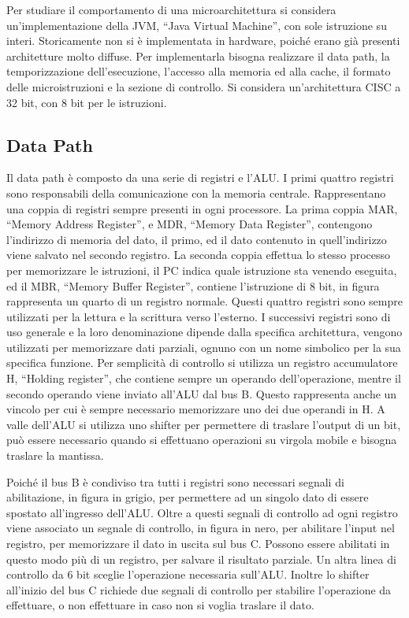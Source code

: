 \documentclass{article}
\numberwithin{equation}{subsection}
\begin{document}
Per studiare il comportamento di una microarchitettura si considera un'implementazione della JVM, ``Java Virtual Machine'', con sole istruzione su interi. Storicamente non si è implementata 
in hardware, poiché erano già presenti architetture molto diffuse. Per implementarla bisogna realizzare il data path, la temporizzazione dell'esecuzione, l'accesso alla memoria ed alla cache, 
il formato delle microistruzioni e la sezione di controllo. Si considera un'architettura CISC a 32 bit, con 8 bit per le istruzioni. 

\subsection{Data Path}

Il data path è composto da una serie di registri e l'ALU. I primi quattro registri sono responsabili della comunicazione con la memoria centrale. Rappresentano una coppia di registri 
sempre presenti in ogni processore. La prima coppia MAR, ``Memory Address Register'', e MDR, ``Memory Data Register'', contengono l'indirizzo di memoria del dato, il primo, ed il dato 
contenuto in quell'indirizzo viene salvato nel secondo registro. La seconda coppia effettua lo stesso processo per memorizzare le istruzioni, il PC indica quale istruzione sta venendo 
eseguita, ed il MBR, ``Memory Buffer Register'', contiene l'istruzione di 8 bit, in figura rappresenta un quarto di un registro normale. Questi 
quattro registri sono sempre utilizzati per la lettura e la scrittura verso l'esterno. 
I successivi registri sono di uso generale e la loro denominazione dipende dalla specifica architettura, vengono utilizzati per memorizzare dati parziali, ognuno con un nome 
simbolico per la sua specifica funzione. Per semplicità di controllo si utilizza un registro accumulatore H, ``Holding register'', che contiene sempre un operando dell'operazione, mentre il secondo 
operando viene inviato all'ALU dal bus B. Questo rappresenta anche un vincolo per cui è sempre necessario memorizzare uno dei due operandi in H. 
A valle dell'ALU si utilizza uno shifter per permettere di traslare l'output di un bit, può essere necessario quando si effettuano operazioni su virgola mobile e bisogna traslare la mantissa. 

Poiché il bus B è condiviso tra tutti i registri sono necessari segnali di abilitazione, in figura in grigio, per permettere ad un singolo dato di essere spostato all'ingresso dell'ALU. 
Oltre a questi segnali di controllo ad ogni registro viene associato un segnale di controllo, in figura in nero, per abilitare l'input nel registro, per memorizzare il dato in uscita sul 
bus C. Possono essere abilitati in questo modo più di un registro, per salvare il risultato parziale. Un altra linea di controllo da 6 bit sceglie l'operazione necessaria sull'ALU. 
Inoltre lo shifter all'inizio del bus C richiede due segnali di controllo per stabilire l'operazione da effettuare, o non effettuare in caso non si voglia traslare il dato. 
\end{document}
